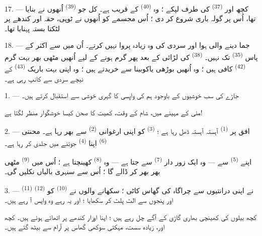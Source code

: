 17. --- کچھ اور  \textsuperscript{(37)} کی طرف
لپکے ؛ وہ  \textsuperscript{(40)} کے قریب ہے۔ کل جو
 \textsuperscript{(39)} اُنھوں نے بنایا تھا، اُس
پر گولہ باری شروع کر دی ؛ اُس مجسمے کو اُنھوں نے ٹوپی، حقہ اور کندھے
پر لٹکتا بستہ پہنایا تھا۔

18. --- جما دینے والی ہوا اور سردی کی وہ زیادہ پروا نہیں کرتے۔ اُن
میں سے اکثر کے پاس  \textsuperscript{(35)} تک نہیں۔
 \textsuperscript{(38)} کی لڑائی کے بعد پھر گرم
ہونے کے لیے اُنھیں مٹھی بھر بہت گرم 
\textsuperscript{(42)} کافی ہیں ؛ وہ اُنھیں بوڑھی 
یاکوبینا سے خریدتے ہیں ؛ وہ اپنی بہت باریک 
\textsuperscript{(43)} کے نیچے سردی سے کانپ رہی ہے۔

\VUsaut{3.0mm}
\VUsaut{3.0mm}

\VUsaut{4.0mm}

1. --- جاڑے کی سب خوشیوں کے باوجود ہم  کی واپسی کا گہری
خوشی سے استقبال کرتے ہیں۔

مئی کے مہینے میں، شام کے وقت، کھیت کا صحن کیسا خوشگوار منظر لگتا ہے!

2. --- افق پر  \textsuperscript{(1)} آہستہ آہستہ ڈھل رہا
ہے ؛  \textsuperscript{(3)} کو اپنی ارغوانی
 \textsuperscript{(2)} سے بھر رہا ہے۔ محنتی
 \textsuperscript{(6)} اپنا 
\textsuperscript{(4)} جوتنے میں جلدی کر رہا ہے۔

اپنے  \textsuperscript{(5)} سے — وہ ایک زور دار
 \textsuperscript{(7)} سے جتا ہے — وہ 
\textsuperscript{(8)} کھینچتا ہے ؛ اُس میں 
\textsuperscript{(9)} مٹھی بھر بھر کر  ڈالے گا ؛ اُس سے
سنہری بالیاں نکلیں گی۔

3. ---  \textsuperscript{(11)} نے اپنی
درانتیوں سے چراگاہ کی گھاس کاٹی ؛ سکھانے والوں نے  \textsuperscript{(10)} کو 
\textsuperscript{(12)} اور پنجوں سے الٹ پلٹ کر سکھایا ؛ اور یہ رہے
وہ واپس آ رہے ہیں۔

کچھ بیلوں کی کھینچی بھاری گاڑی کے آگے چل رہے ہیں ؛ اپنا اوزار کندھے
پر اٹھائے ہوئے ہیں۔ کچھ اور، زیادہ سست، مہکتی سوکھی گھاس پر آرام سے
بیٹھ گئے ہیں۔

